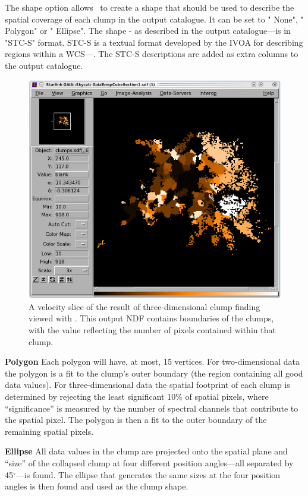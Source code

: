 \documentclass[11pt,oneside,chapters]{starlink}
\begin{document}
The shape option allows \findclumps\ to create a shape that should be
used to describe the spatial coverage of each clump in the output
catalogue. It can be set to " None", " Polygon" or " Ellipse". The shape
- as described in the output catalogue---is in "STC-S" format. STC-S is
a textual format developed by the IVOA for describing regions within
a WCS---.
The STC-S descriptions are added as extra columns to the output catalogue.
\vspace{0.7cm}
\begin{figure}[h!]
\begin{center}
\includegraphics[width=0.7\linewidth]{sc20_clumps}
\caption[A velocity slice of the result of three-dimensional clump finding
viewed with \gaia.]{\label{fig:clumps2}
  A velocity slice of the result of three-dimensional clump finding viewed
  with \gaia. This output NDF contains boundaries of the clumps, with the
  value reflecting the number of pixels contained within that clump.}
\end{center}
\end{figure}

\begin{aligndesc}
\item[\textbf{Polygon}]
Each polygon will have, at most, 15 vertices. For two-dimensional data
the polygon is a fit to the clump's outer boundary (the region
containing all good data values). For three-dimensional data the
spatial footprint of each clump is determined by rejecting the least
significant 10\% of spatial pixels, where ``significance'' is measured
by the number of spectral channels that contribute to the spatial
pixel. The polygon is then a fit to the outer boundary of the
remaining spatial pixels.
\vspace{0.7cm}\\
\item[\textbf{Ellipse}]
All data values in the clump are projected onto the spatial plane and
``size'' of the collapsed clump at four different position angles---all
separated by 45$^\circ$---is found. The ellipse that generates
the same sizes at the four position angles is then found and used as
the clump shape.
\end{aligndesc}
\end{document}
